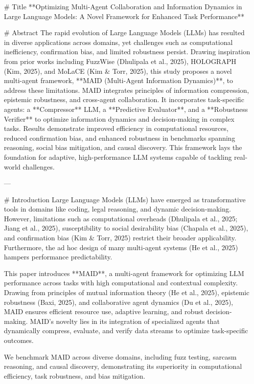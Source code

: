 # Title  
**Optimizing Multi-Agent Collaboration and Information Dynamics in Large Language Models: A Novel Framework for Enhanced Task Performance**

# Abstract  
The rapid evolution of Large Language Models (LLMs) has resulted in diverse applications across domains, yet challenges such as computational inefficiency, confirmation bias, and limited robustness persist. Drawing inspiration from prior works including FuzzWise (Dhulipala et al., 2025), HOLOGRAPH (Kim, 2025), and MoLaCE (Kim & Torr, 2025), this study proposes a novel multi-agent framework, **MAID (Multi-Agent Information Dynamics)**, to address these limitations. MAID integrates principles of information compression, epistemic robustness, and cross-agent collaboration. It incorporates task-specific agents: a **Compressor** LLM, a **Predictive Evaluator**, and a **Robustness Verifier** to optimize information dynamics and decision-making in complex tasks. Results demonstrate improved efficiency in computational resources, reduced confirmation bias, and enhanced robustness in benchmarks spanning reasoning, social bias mitigation, and causal discovery. This framework lays the foundation for adaptive, high-performance LLM systems capable of tackling real-world challenges.

---

# Introduction  
Large Language Models (LLMs) have emerged as transformative tools in domains like coding, legal reasoning, and dynamic decision-making. However, limitations such as computational overheads (Dhulipala et al., 2025; Jiang et al., 2025), susceptibility to social desirability bias (Chapala et al., 2025), and confirmation bias (Kim & Torr, 2025) restrict their broader applicability. Furthermore, the ad hoc design of many multi-agent systems (He et al., 2025) hampers performance predictability.

This paper introduces **MAID**, a multi-agent framework for optimizing LLM performance across tasks with high computational and contextual complexity. Drawing from principles of mutual information theory (He et al., 2025), epistemic robustness (Baxi, 2025), and collaborative agent dynamics (Du et al., 2025), MAID ensures efficient resource use, adaptive learning, and robust decision-making. MAID's novelty lies in its integration of specialized agents that dynamically compress, evaluate, and verify data streams to optimize task-specific outcomes.

We benchmark MAID across diverse domains, including fuzz testing, sarcasm reasoning, and causal discovery, demonstrating its superiority in computational efficiency, task robustness, and bias mitigation.

